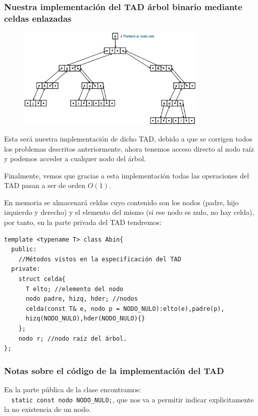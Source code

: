 \subsubsection*{Nuestra implementación del TAD árbol binario mediante celdas enlazadas}
\begin{figure}[h]
  \begin{center}
    \includegraphics[width=0.8\textwidth]{assets/ICE3.png}
  \end{center}
\end{figure}
Esta será nuestra implementación de dicho TAD, debido a que se corrigen todos los problemas descritos anteriormente, ahora tenemos acceso directo al nodo raíz y podemos acceder a cualquer nodo del árbol.

Finalmente, vemos que gracias a esta implementación todas las operaciones del TAD pasan a ser de orden \(O(1)\).

En memoria se almacenará celdas cuyo contenido son los nodos (padre, hijo izquierdo y derecho) y el elemento del mismo (si ese nodo es nulo, no hay celda), por tanto, en la parte privada del TAD tendremos:
\begin{verbatim}
template <typename T> class Abin{
  public:
    //Métodos vistos en la especificación del TAD
  private:
    struct celda{
      T elto; //elemento del nodo
      nodo padre, hizq, hder; //nodos
      celda(const T& e, nodo p = NODO_NULO):elto(e),padre(p),
      hizq(NODO_NULO),hder(NODO_NULO){}
    };
    nodo r; //nodo raíz del árbol.
};
\end{verbatim}
\subsubsection*{Notas sobre el código de la implementación del TAD}
En la parte pública de la clase encontramos:\\
\verb|  static const nodo NODO_NULO;|, que nos va a permitir indicar explicitamente la no existencia de un nodo.

